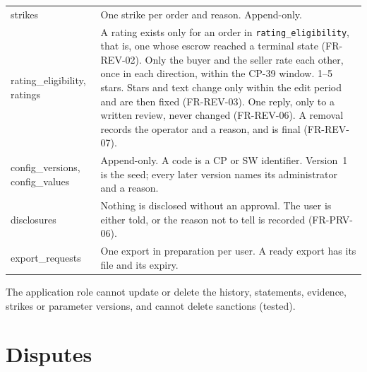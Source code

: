 \documentclass[11pt,a4paper]{article}
\newenvironment{dtable}[1]{\small\begin{longtable}{#1}}{\end{longtable}}
\begin{document}
\begin{dtable}{@{}>{\ttfamily\raggedright\arraybackslash}p{3.6cm}>{\raggedright\arraybackslash}p{11.6cm}@{}}
strikes & One strike per order and reason. Append-only. \\
rating\_eligibility, ratings & A rating exists only for an order in \texttt{rating\_eligibility}, that is, one whose escrow reached a terminal state (FR-REV-02). Only the buyer and the seller rate each other, once in each direction, within the CP-39 window. 1--5 stars. Stars and text change only within the edit period and are then fixed (FR-REV-03). One reply, only to a written review, never changed (FR-REV-06). A removal records the operator and a reason, and is final (FR-REV-07). \\
config\_versions, config\_values & Append-only. A code is a CP or SW identifier. Version~1 is the seed; every later version names its administrator and a reason. \\
disclosures & Nothing is disclosed without an approval. The user is either told, or the reason not to tell is recorded (FR-PRV-06). \\
export\_requests & One export in preparation per user. A ready export has its file and its expiry. \\
\bottomrule
\end{dtable}
The application role cannot update or delete the history, statements, evidence, strikes or parameter versions, and cannot delete sanctions (tested).

\section{Disputes}
\label{sec:disputes}
\end{document}
